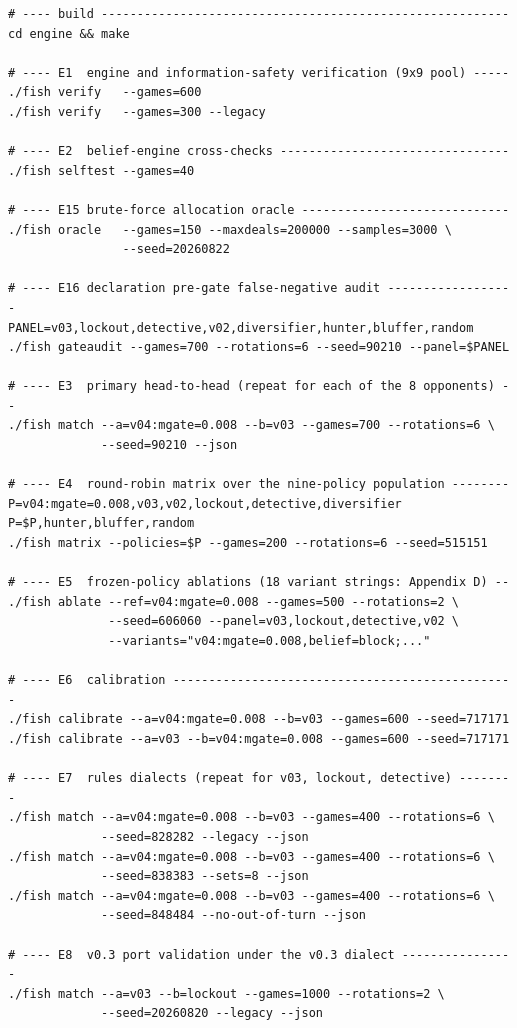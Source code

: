 \begin{verbatim}
# ---- build ---------------------------------------------------------
cd engine && make

# ---- E1  engine and information-safety verification (9x9 pool) -----
./fish verify   --games=600
./fish verify   --games=300 --legacy

# ---- E2  belief-engine cross-checks --------------------------------
./fish selftest --games=40

# ---- E15 brute-force allocation oracle -----------------------------
./fish oracle   --games=150 --maxdeals=200000 --samples=3000 \
                --seed=20260822

# ---- E16 declaration pre-gate false-negative audit ------------------
PANEL=v03,lockout,detective,v02,diversifier,hunter,bluffer,random
./fish gateaudit --games=700 --rotations=6 --seed=90210 --panel=$PANEL

# ---- E3  primary head-to-head (repeat for each of the 8 opponents) --
./fish match --a=v04:mgate=0.008 --b=v03 --games=700 --rotations=6 \
             --seed=90210 --json

# ---- E4  round-robin matrix over the nine-policy population --------
P=v04:mgate=0.008,v03,v02,lockout,detective,diversifier
P=$P,hunter,bluffer,random
./fish matrix --policies=$P --games=200 --rotations=6 --seed=515151

# ---- E5  frozen-policy ablations (18 variant strings: Appendix D) --
./fish ablate --ref=v04:mgate=0.008 --games=500 --rotations=2 \
              --seed=606060 --panel=v03,lockout,detective,v02 \
              --variants="v04:mgate=0.008,belief=block;..."

# ---- E6  calibration ------------------------------------------------
./fish calibrate --a=v04:mgate=0.008 --b=v03 --games=600 --seed=717171
./fish calibrate --a=v03 --b=v04:mgate=0.008 --games=600 --seed=717171

# ---- E7  rules dialects (repeat for v03, lockout, detective) --------
./fish match --a=v04:mgate=0.008 --b=v03 --games=400 --rotations=6 \
             --seed=828282 --legacy --json
./fish match --a=v04:mgate=0.008 --b=v03 --games=400 --rotations=6 \
             --seed=838383 --sets=8 --json
./fish match --a=v04:mgate=0.008 --b=v03 --games=400 --rotations=6 \
             --seed=848484 --no-out-of-turn --json

# ---- E8  v0.3 port validation under the v0.3 dialect ----------------
./fish match --a=v03 --b=lockout --games=1000 --rotations=2 \
             --seed=20260820 --legacy --json


\end{verbatim}
